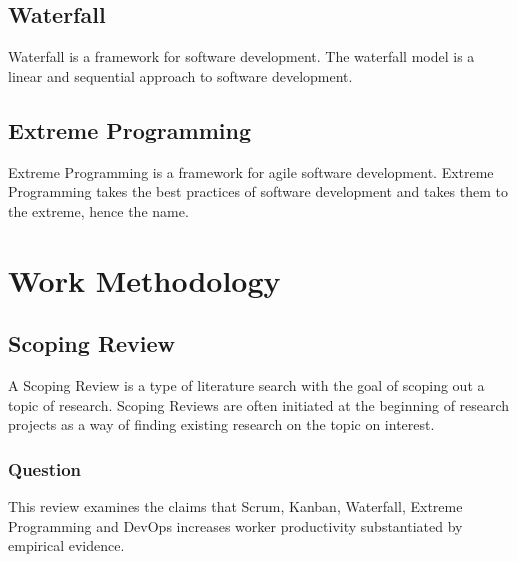 \documentclass[12pt]{article}
\begin{document}
\subsection{Waterfall}
Waterfall \cite{WaterfallModel2025} is a framework for software development.
The waterfall model is a linear and sequential approach to software development.

\subsection{Extreme Programming}
Extreme Programming \cite{ExtremeProgramming2025} is a framework for agile software development.
Extreme Programming takes the best practices of software development and takes them to the extreme, hence the name.

\section{Work Methodology}

\subsection{Scoping Review}
A Scoping Review is a type of literature search with the goal of scoping out a topic of research.
Scoping Reviews are often initiated at the beginning of research projects as a way of finding existing 
research on the topic on interest.

\subsubsection{Question}
This review examines the claims that Scrum, Kanban, Waterfall, Extreme Programming and DevOps 
increases worker productivity substantiated by empirical evidence.
\end{document}
